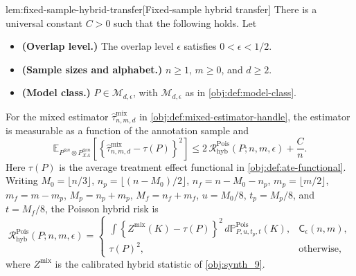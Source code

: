 \documentclass[11pt]{article}
\begin{document}
\begin{lemmav}{lem:fixed-sample-hybrid-transfer}[Fixed-sample hybrid transfer]
There is a universal constant \(C>0\) such that the following holds.  Let
\begin{itemize}
\item \textbf{(Overlap level.)} The overlap level \(\epsilon\) satisfies \(0<\epsilon<1/2\).
\item \textbf{(Sample sizes and alphabet.)} \(n\ge 1\), \(m\ge 0\), and \(d\ge 2\).
\item \textbf{(Model class.)} \(P\in\mathcal M_{d,\epsilon}\), with \(\mathcal M_{d,\epsilon}\) as in \cref{obj:def:model-class}.
\end{itemize}
For the mixed estimator \(\widehat\tau^{\mathrm{mix}}_{n,m,d}\) in \cref{obj:def:mixed-estimator-handle}, the estimator is measurable as a function of the annotation sample and
\[
\mathbb E_{P^{\otimes n}\otimes P_{XA}^{\otimes m}}
\left[
  \left\{\widehat\tau^{\mathrm{mix}}_{n,m,d}-\tau(P)\right\}^2
\right]
\le
2\,\mathcal R^{\mathrm{Pois}}_{\mathrm{hyb}}(P;n,m,\epsilon)
+\frac{C}{n}.
\]
Here \(\tau(P)\) is the average treatment effect functional in \cref{obj:def:ate-functional}.  Writing
\(M_0=\lfloor n/3\rfloor\), \(n_p=\lfloor(n-M_0)/2\rfloor\),
\(n_f=n-M_0-n_p\), \(m_p=\lfloor m/2\rfloor\), \(m_f=m-m_p\),
\(M_p=n_p+m_p\), \(M_f=n_f+m_f\), \(u=M_0/8\), \(t_p=M_p/8\), and
\(t=M_f/8\), the Poisson hybrid risk is
\[
\mathcal R^{\mathrm{Pois}}_{\mathrm{hyb}}(P;n,m,\epsilon)
=
\begin{cases}
\displaystyle
\int
\left\{
  Z^{\mathrm{mix}}(K)-\tau(P)
\right\}^2
\,d\mathbb P^{\mathrm{Pois}}_{P,u,t_p,t}(K),
&
\mathsf C_\epsilon(n,m),\\[1.2em]
\displaystyle
\tau(P)^2,
&
\text{otherwise,}
\end{cases}
\]
where \(Z^{\mathrm{mix}}\) is the calibrated hybrid statistic of \cref{obj:synth_9}.
\end{lemmav}
\end{document}
